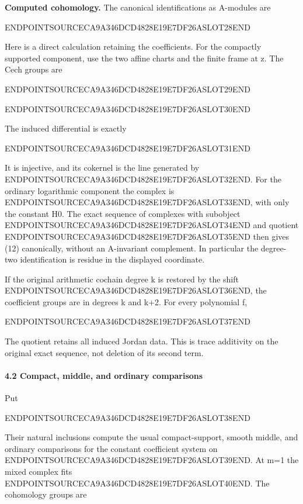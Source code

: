 \textbf{Computed cohomology.} The canonical identifications as A-modules are

ENDPOINTSOURCECA9A346DCD4828E19E7DF26ASLOT28END

Here is a direct calculation retaining the coefficients. For the compactly supported component, use the two affine charts and the finite frame at z. The Cech groups are

ENDPOINTSOURCECA9A346DCD4828E19E7DF26ASLOT29END

ENDPOINTSOURCECA9A346DCD4828E19E7DF26ASLOT30END

The induced differential is exactly

ENDPOINTSOURCECA9A346DCD4828E19E7DF26ASLOT31END

It is injective, and its cokernel is the line generated by ENDPOINTSOURCECA9A346DCD4828E19E7DF26ASLOT32END. For the ordinary logarithmic component the complex is ENDPOINTSOURCECA9A346DCD4828E19E7DF26ASLOT33END, with only the constant H0. The exact sequence of complexes with subobject ENDPOINTSOURCECA9A346DCD4828E19E7DF26ASLOT34END and quotient ENDPOINTSOURCECA9A346DCD4828E19E7DF26ASLOT35END then gives (12) canonically, without an A-invariant complement. In particular the degree-two identification is residue in the displayed coordinate.

If the original arithmetic cochain degree k is restored by the shift ENDPOINTSOURCECA9A346DCD4828E19E7DF26ASLOT36END, the coefficient groups are in degrees k and k+2. For every polynomial f,

ENDPOINTSOURCECA9A346DCD4828E19E7DF26ASLOT37END

The quotient retains all induced Jordan data. This is trace additivity on the original exact sequence, not deletion of its second term.

\paragraph{4.2 Compact, middle, and ordinary comparisons}\label{endpoint-exponential_original--compact-middle-and-ordinary-comparisons}

Put

ENDPOINTSOURCECA9A346DCD4828E19E7DF26ASLOT38END

Their natural inclusions compute the usual compact-support, smooth middle, and ordinary comparisons for the constant coefficient system on ENDPOINTSOURCECA9A346DCD4828E19E7DF26ASLOT39END. At m=1 the mixed complex fits ENDPOINTSOURCECA9A346DCD4828E19E7DF26ASLOT40END. The cohomology groups are

